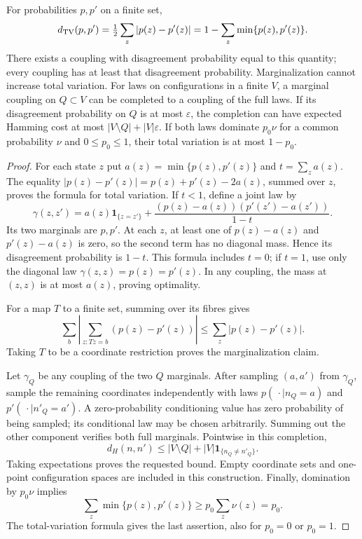 \begin{lemma}\label{l:finitecoupling}
For probabilities \(p,p'\) on a finite set,
\[
 d_{\rm TV}(p,p')=\tfrac12\sum_z|p(z)-p'(z)|
          =1-\sum_z\min\{p(z),p'(z)\}.
\]
There exists a coupling with disagreement probability equal to this
quantity; every coupling has at least that disagreement probability.
Marginalization cannot increase total variation.
For laws on configurations in a finite \(V\), a marginal coupling
on \(Q\subset V\) can be completed to a coupling of the full laws.
If its disagreement probability on \(Q\) is at most \(\varepsilon\),
the completion can have expected Hamming cost at most
\(|V\setminus Q|+|V|\varepsilon\).
If both laws dominate \(p_0\nu\) for a common probability \(\nu\)
and \(0\le p_0\le1\), their total variation is at most \(1-p_0\).
\end{lemma}

\begin{proof}
For each state \(z\) put \(a(z)=\min\{p(z),p'(z)\}\) and
\(t=\sum_z a(z)\).  The equality
\(|p(z)-p'(z)|=p(z)+p'(z)-2a(z)\), summed over \(z\), proves
the formula for total variation.  If \(t<1\), define a joint law by
\[
 \gamma(z,z')=a(z)\mathbf1_{\{z=z'\}}
       +\frac{(p(z)-a(z))(p'(z')-a(z'))}{1-t}.
\]
Its two marginals are \(p,p'\).  At each \(z\), at least one of
\(p(z)-a(z)\) and \(p'(z)-a(z)\) is zero, so the second term
has no diagonal mass.  Hence its disagreement probability is \(1-t\).
This formula includes \(t=0\); if \(t=1\), use only the diagonal
law \(\gamma(z,z)=p(z)=p'(z)\).  In any coupling, the mass at
\((z,z)\) is at most \(a(z)\), proving optimality.

For a map \(T\) to a finite set, summing over its fibres gives
\[
 \sum_b\left|\sum_{z:Tz=b}(p(z)-p'(z))\right|
       \le\sum_z|p(z)-p'(z)|.
\]
Taking \(T\) to be a coordinate restriction proves the marginalization
claim.

Let \(\gamma_Q\) be any coupling of the two \(Q\) marginals.
After sampling \((a,a')\) from \(\gamma_Q\), sample the remaining
coordinates independently with laws
\(p(\,\cdot\mid n_Q=a)\) and \(p'(\,\cdot\mid n'_Q=a')\).
A zero-probability conditioning value has zero probability of being
sampled; its conditional law may be chosen arbitrarily.  Summing out
the other component verifies both full marginals.  Pointwise in this
completion,
\[
 d_H(n,n')\le |V\setminus Q|
                      +|V|\mathbf1_{\{n_Q\ne n'_Q\}}.
\]
Taking expectations proves the requested bound.  Empty coordinate sets
and one-point configuration spaces are included in this construction.
Finally, domination by \(p_0\nu\) implies
\[
 \sum_z\min\{p(z),p'(z)\}\ge p_0\sum_z\nu(z)=p_0.
\]
The total-variation formula gives the last assertion, also for
\(p_0=0\) or \(p_0=1\).
\end{proof}

